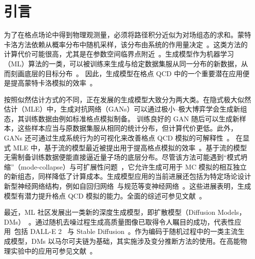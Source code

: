 \section{引言}

为了在格点场论中得到物理观测量，必须将路径积分近似为对场组态的求和。蒙特卡洛方法依赖从概率分布中随机采样，该分布由系统的作用量决定~\cite{Knechtli:2017sna}。这类方法的计算代价可能很高，尤其是在参数空间临界点附近~\cite{Wolff:1989wq}。生成模型作为机器学习（ML）算法的一类，可以被训练来生成与给定数据集服从同一分布的新数据，从而刻画底层的目标分布~\cite{tomczak:2022deep}。
因此，生成模型在格点 QCD 中的一个重要潜在应用便是提高蒙特卡洛模拟的效率~\cite{Boyda:2022nmh}。

按照似然估计方式的不同，正在发展的生成模型大致分为两大类。在隐式极大似然估计（MLE）中，生成对抗网络（GANs）可以通过极小--极大博弈学会生成新组态，其训练数据由例如标准格点模拟制备。
训练良好的 GAN 随后可以生成新样本，这些样本应当与原数据集服从相同的统计分布，但计算代价更低。此外，GANs 还可通过生成系统行为的可视化来改善格点 QCD 模拟的可解释性~\cite{Zhou:2018ill,Pawlowski:2018qxs}。
在显式 MLE 中，基于流的模型最近被提出用于提高格点模拟的效率~\cite{ Albergo:2019eim,  Kanwar:2020xzo, Nicoli:2020njz,Albergo:2021bna, Albergo:2021vyo, DelDebbio:2021qwf, Hackett:2021idh, Albergo:2022qfi, Bacchio:2022vje, Caselle:2022acb, Chen:2022ytr, Gerdes:2022eve, Albandea:2023wgd, Singha:2023cql}。基于流的模型无需制备训练数据便能直接逼近量子场的底层分布。尽管该方法可能遇到``模式坍缩''（mode-collapse）与可扩展性问题~\cite{Abbott:2022zsh,Nicoli:2023qsl}，它允许生成可用于 MC 模拟的相互独立的新组态，同样降低了计算成本。生成模型应用的当前进展还包括为特定场论设计新型神经网络结构，例如自回归网络~\cite{Wang:2020hji,Luo:2023opo}与规范等变神经网络~\cite{Favoni:2020reg, Kanwar:2020xzo, Aronsson:2023rli, Abbott:2022zhs, Gerdes:2022eve,Luo:2023opo}。这些进展表明，生成模型有潜力提升格点 QCD 模拟的能力。全面的综述可参见文献~\cite{Zhou:2023pti, He:2023zin}。

最近，ML 社区发展出一类新的深度生成模型，即扩散模型（Diffusion Models，DMs）~\cite{yang:2022diffusion}。通过随机去噪过程生成高质量图像已取得令人瞩目的成功，代表性应用~\cite{Croitoru:2023dm}包括 DALL-E 2~\cite{2022arXiv220406125R} 与 Stable Diffusion~\cite{Rombach_2022_CVPR}。作为编码于随机过程中的一类主流生成模型，DMs 以马尔可夫链为基础，其实施涉及变分推断方法的使用。在高能物理实验中的应用可参见文献~\cite{Mikuni:2022xry,Mikuni:2023dvk}。


